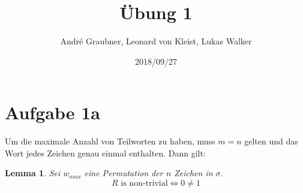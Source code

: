 \documentclass[a4paper]{article}
\title{Übung 1}
\author{André Graubner, Leonard von Kleist, Lukas Walker}
\date{2018/09/27}
\newtheorem{lemma}{Lemma}
\begin{document}
 

\maketitle

\section{Aufgabe 1a}
	Um die maximale Anzahl von Teilworten zu haben,
	muss $m = n$ gelten und das Wort jedes Zeichen
	genau einmal enthalten. Dann gilt:

	\begin{lemma}
		Sei $w_{max}$ eine Permutation der $n$ Zeichen in $\sigma$.
		\[R \text{ is non-trivial} \iff 0 \neq 1\]
	\end{lemma}
\end{document}
